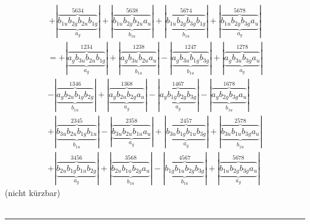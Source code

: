 \documentclass{article}
\begin{document}
\begin{multline*}
+\left|\underbrace{\overbrace{b_{1u} b_{2g} b_{2u} b_{1g}}^{5 6 3 4}}_{a_{g}}\right|+\left|\underbrace{\overbrace{b_{1u} b_{2g} b_{2u} a_{u}}^{5 6 3 8}}_{b_{1u}}\right|+\left|\underbrace{\overbrace{b_{1u} b_{2g} b_{3g} b_{1g}}^{5 6 7 4}}_{b_{1u}}\right|+\left|\underbrace{\overbrace{b_{1u} b_{2g} b_{3g} a_{u}}^{5 6 7 8}}_{a_{g}}\right|
\end{multline*}\begin{multline*}
=+\left|\underbrace{\overbrace{a_{g} b_{3u} b_{2u} b_{1g}}^{1 2 3 4}}_{a_{g}}\right|+\left|\underbrace{\overbrace{a_{g} b_{3u} b_{2u} a_{u}}^{1 2 3 8}}_{b_{1u}}\right|-\left|\underbrace{\overbrace{a_{g} b_{3u} b_{1g} b_{3g}}^{1 2 4 7}}_{b_{1u}}\right|+\left|\underbrace{\overbrace{a_{g} b_{3u} b_{3g} a_{u}}^{1 2 7 8}}_{a_{g}}\right|\\
-\left|\underbrace{\overbrace{a_{g} b_{2u} b_{1g} b_{2g}}^{1 3 4 6}}_{b_{1u}}\right|+\left|\underbrace{\overbrace{a_{g} b_{2u} b_{2g} a_{u}}^{1 3 6 8}}_{a_{g}}\right|-\left|\underbrace{\overbrace{a_{g} b_{1g} b_{2g} b_{3g}}^{1 4 6 7}}_{a_{g}}\right|-\left|\underbrace{\overbrace{a_{g} b_{2g} b_{3g} a_{u}}^{1 6 7 8}}_{b_{1u}}\right|\\
+\left|\underbrace{\overbrace{b_{3u} b_{2u} b_{1g} b_{1u}}^{2 3 4 5}}_{b_{1u}}\right|-\left|\underbrace{\overbrace{b_{3u} b_{2u} b_{1u} a_{u}}^{2 3 5 8}}_{a_{g}}\right|+\left|\underbrace{\overbrace{b_{3u} b_{1g} b_{1u} b_{3g}}^{2 4 5 7}}_{a_{g}}\right|+\left|\underbrace{\overbrace{b_{3u} b_{1u} b_{3g} a_{u}}^{2 5 7 8}}_{b_{1u}}\right|\\
+\left|\underbrace{\overbrace{b_{2u} b_{1g} b_{1u} b_{2g}}^{3 4 5 6}}_{a_{g}}\right|+\left|\underbrace{\overbrace{b_{2u} b_{1u} b_{2g} a_{u}}^{3 5 6 8}}_{b_{1u}}\right|-\left|\underbrace{\overbrace{b_{1g} b_{1u} b_{2g} b_{3g}}^{4 5 6 7}}_{b_{1u}}\right|+\left|\underbrace{\overbrace{b_{1u} b_{2g} b_{3g} a_{u}}^{5 6 7 8}}_{a_{g}}\right|
\end{multline*}(nicht kürzbar)\\ \\
\hrule\newpage 
\end{document}
